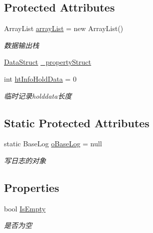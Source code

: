 \subsection*{Protected Attributes}
\begin{DoxyCompactItemize}
\item 
Array\+List \mbox{\hyperlink{class_t_net_1_1_service_1_1_data_struct_a7c313087cb8c673c83bee6fdaee712f4}{array\+List}} = new Array\+List()
\begin{DoxyCompactList}\small\item\em 数据输出栈 \end{DoxyCompactList}\item 
\mbox{\hyperlink{class_t_net_1_1_service_1_1_data_struct}{Data\+Struct}} \mbox{\hyperlink{class_t_net_1_1_service_1_1_data_struct_a999ab6ec6c0296062fcce662ebd563f8}{\+\_\+property\+Struct}}
\item 
int \mbox{\hyperlink{class_t_net_1_1_service_1_1_data_struct_a984b1b2aa68770df2b735dcea4e80aac}{ht\+Info\+Hold\+Data}} = 0
\begin{DoxyCompactList}\small\item\em 临时记录holddata长度 \end{DoxyCompactList}\end{DoxyCompactItemize}
\subsection*{Static Protected Attributes}
\begin{DoxyCompactItemize}
\item 
static Base\+Log \mbox{\hyperlink{class_t_net_1_1_service_1_1_data_struct_af2c2876316636147cb1059bbd5277c00}{o\+Base\+Log}} = null
\begin{DoxyCompactList}\small\item\em 写日志的对象 \end{DoxyCompactList}\end{DoxyCompactItemize}
\subsection*{Properties}
\begin{DoxyCompactItemize}
\item 
bool \mbox{\hyperlink{class_t_net_1_1_service_1_1_data_struct_ad0ed24b6b577b35cacf37a8eac76907a}{Is\+Empty}}
\begin{DoxyCompactList}\small\item\em 是否为空 \end{DoxyCompactList}\end{DoxyCompactItemize}


